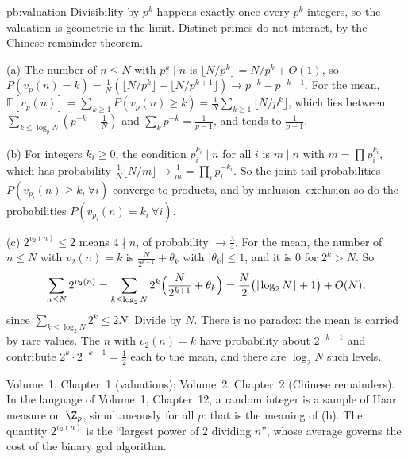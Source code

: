 \begin{solution}{pb:valuation}
\idea Divisibility by $p^k$ happens exactly once every $p^k$ integers, so the valuation is geometric in the limit. Distinct
primes do not interact, by the Chinese remainder theorem.

\writeup (a) The number of $n\le N$ with $p^k\mid n$ is $\lfloor N/p^k\rfloor=N/p^k+O(1)$, so
$P(v_p(n)=k)=\frac1N(\lfloor N/p^k\rfloor-\lfloor N/p^{k+1}\rfloor)\to p^{-k}-p^{-k-1}$. For the mean,
$\mathbb E[v_p(n)]=\sum_{k\ge1}P(v_p(n)\ge k)=\frac1N\sum_{k\ge1}\lfloor N/p^k\rfloor$, which lies between
$\sum_{k\le\log_pN}(p^{-k}-\frac1N)$ and $\sum_kp^{-k}=\frac1{p-1}$, and tends to $\frac1{p-1}$.

(b) For integers $k_i\ge0$, the condition $p_i^{k_i}\mid n$ for all $i$ is $m\mid n$ with $m=\prod p_i^{k_i}$, which has
probability $\frac1N\lfloor N/m\rfloor\to\frac1m=\prod_ip_i^{-k_i}$. So the joint tail probabilities $P(v_{p_i}(n)\ge k_i\ \forall i)$
converge to products, and by inclusion--exclusion so do the probabilities $P(v_{p_i}(n)=k_i\ \forall i)$.

(c) $2^{v_2(n)}\le2$ means $4\nmid n$, of probability $\to\frac34$. For the mean, the number of $n\le N$ with $v_2(n)=k$ is
$\frac N{2^{k+1}}+\theta_k$ with $|\theta_k|\le1$, and it is $0$ for $2^k>N$. So
\[
\sum_{n\le N}2^{v_2(n)}=\sum_{k\le\log_2N}2^k\Bigl(\frac N{2^{k+1}}+\theta_k\Bigr)=\frac N2\bigl(\lfloor\log_2N\rfloor+1\bigr)+O(N),
\]
since $\sum_{k\le\log_2N}2^k\le2N$. Divide by $N$. There is no paradox: the mean is carried by rare values. The $n$ with
$v_2(n)=k$ have probability about $2^{-k-1}$ and contribute $2^k\cdot2^{-k-1}=\frac12$ each to the mean, and there are
$\log_2N$ such levels.

\tools Volume~1, Chapter~1 (valuations); Volume~2, Chapter~2 (Chinese remainders).
\leads In the language of Volume~1, Chapter~12, a random integer is a sample of Haar measure on $\Z_p$, simultaneously for all $p$:
that is the meaning of (b). The quantity $2^{v_2(n)}$ is the ``largest power of $2$ dividing $n$'', whose average governs the
cost of the binary gcd algorithm.
\end{solution}

